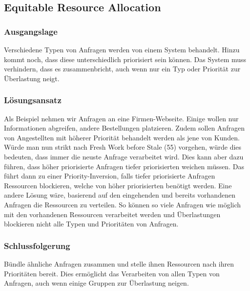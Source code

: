 \subsection{Equitable Resource Allocation}

\subsubsection*{Ausgangslage}

Verschiedene Typen von Anfragen werden von einem System behandelt. Hinzu kommt noch, dass diese unterschiedlich priorisiert sein können. Das System muss verhindern, dass es zusammenbricht, auch wenn nur ein Typ oder Priorität zur Überlastung neigt.

\subsubsection*{Lösungsansatz}

Als Beispiel nehmen wir Anfragen an eine Firmen-Webseite. Einige wollen nur Informationen abgreifen, andere Bestellungen platzieren. Zudem sollen Anfragen von Angestellten mit höherer Priorität behandelt werden als jene von Kunden.
Würde man nun strikt nach Fresh Work before Stale (55) vorgehen, würde dies bedeuten, dass immer die neuste Anfrage verarbeitet wird. Dies kann aber dazu führen, dass höher priorisierte Anfragen tiefer priorisierten weichen müssen. Das führt dann zu einer Priority-Inversion, falls tiefer priorisierte Anfragen Ressourcen blockieren, welche von höher priorisierten benötigt werden.
Eine andere Lösung wäre, basierend auf den eingehenden und bereits vorhandenen Anfragen die Ressourcen zu verteilen. So können so viele Anfragen wie möglich mit den vorhandenen Ressourcen verarbeitet werden und Überlastungen blockieren nicht alle Typen und Prioritäten von Anfragen.

\subsubsection*{Schlussfolgerung}

Bündle ähnliche Anfragen zusammen und stelle ihnen Ressourcen nach ihren Prioritäten bereit. Dies ermöglicht das Verarbeiten von allen Typen von Anfragen, auch wenn einige Gruppen zur Überlastung neigen.

